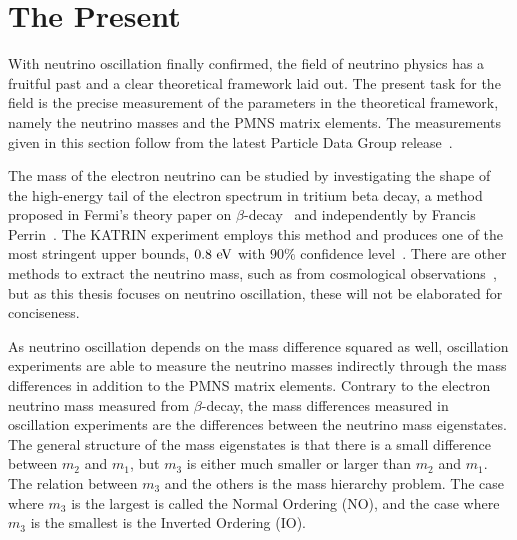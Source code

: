 


\section{The Present}
With neutrino oscillation finally confirmed, the field of neutrino physics has a fruitful past and a clear theoretical framework laid out.
The present task for the field is the precise measurement of the parameters in the theoretical framework, namely the neutrino masses and the PMNS matrix elements.
The measurements given in this section follow from the latest Particle Data Group release~\cite{ParticleDataGroup:2024cfk}.

The mass of the electron neutrino can be studied by investigating the shape of the high-energy tail of the electron spectrum in tritium beta decay, a method proposed in Fermi's theory paper on $\beta$-decay~\cite{Fermi:1934hr} and independently by Francis Perrin~\cite{Perrin1933}.
The KATRIN experiment employs this method and produces one of the most stringent upper bounds, $0.8~\textrm{eV}$ with $90\%$ confidence level~\cite{KATRIN:2021uub}.
There are other methods to extract the neutrino mass, such as from cosmological observations~\cite{Brieden:2022lsd}, but as this thesis focuses on neutrino oscillation, these will not be elaborated for conciseness.

As neutrino oscillation depends on the mass difference squared as well, oscillation experiments are able to measure the neutrino masses indirectly through the mass differences in addition to the PMNS matrix elements.
Contrary to the electron neutrino mass measured from $\beta$-decay, the mass differences measured in oscillation experiments are the differences between the neutrino mass eigenstates.
The general structure of the mass eigenstates is that there is a small difference between $m_2$ and $m_1$, but $m_3$ is either much smaller or larger than $m_2$ and $m_1$.
The relation between $m_3$ and the others is the mass hierarchy problem.
The case where $m_3$ is the largest is called the Normal Ordering (NO), and the case where $m_3$ is the smallest is the Inverted Ordering (IO).


